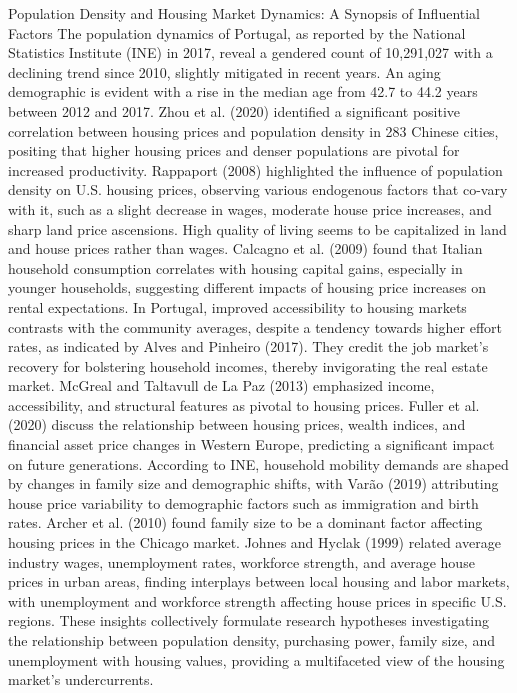 \documentclass{aip-cp}
\begin{document}
Population Density and Housing Market Dynamics: A Synopsis of Influential Factors
The population dynamics of Portugal, as reported by the National Statistics Institute (INE) in 2017, reveal a gendered count of 10,291,027 with a declining trend since 2010, slightly mitigated in recent years. An aging demographic is evident with a rise in the median age from 42.7 to 44.2 years between 2012 and 2017. Zhou et al. (2020) identified a significant positive correlation between housing prices and population density in 283 Chinese cities, positing that higher housing prices and denser populations are pivotal for increased productivity.
Rappaport (2008) highlighted the influence of population density on U.S. housing prices, observing various endogenous factors that co-vary with it, such as a slight decrease in wages, moderate house price increases, and sharp land price ascensions. High quality of living seems to be capitalized in land and house prices rather than wages. Calcagno et al. (2009) found that Italian household consumption correlates with housing capital gains, especially in younger households, suggesting different impacts of housing price increases on rental expectations.
In Portugal, improved accessibility to housing markets contrasts with the community averages, despite a tendency towards higher effort rates, as indicated by Alves and Pinheiro (2017). They credit the job market's recovery for bolstering household incomes, thereby invigorating the real estate market. McGreal and Taltavull de La Paz (2013) emphasized income, accessibility, and structural features as pivotal to housing prices.
Fuller et al. (2020) discuss the relationship between housing prices, wealth indices, and financial asset price changes in Western Europe, predicting a significant impact on future generations. According to INE, household mobility demands are shaped by changes in family size and demographic shifts, with Varão (2019) attributing house price variability to demographic factors such as immigration and birth rates. Archer et al. (2010) found family size to be a dominant factor affecting housing prices in the Chicago market.
Johnes and Hyclak (1999) related average industry wages, unemployment rates, workforce strength, and average house prices in urban areas, finding interplays between local housing and labor markets, with unemployment and workforce strength affecting house prices in specific U.S. regions.
These insights collectively formulate research hypotheses investigating the relationship between population density, purchasing power, family size, and unemployment with housing values, providing a multifaceted view of the housing market's undercurrents.
\end{document}
